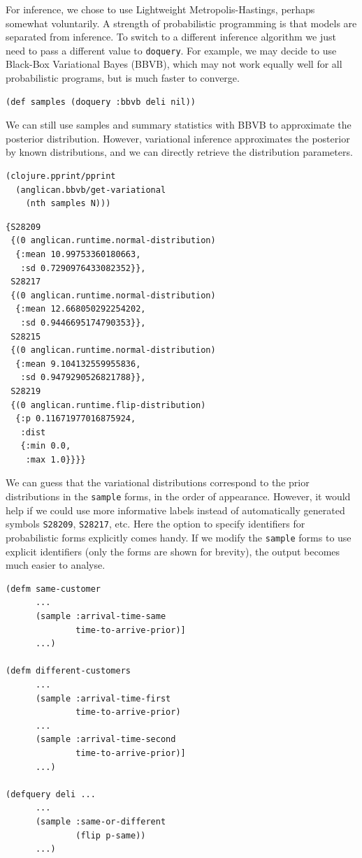 \documentclass[preprint]{sigplanconf}
\begin{document}
For inference, we chose to use  Lightweight
Metropolis-Hastings, perhaps somewhat voluntarily. A strength of
probabilistic programming is that models are separated from
inference. To switch to a different inference algorithm we just
need to pass a different value to \texttt{doquery}. For example,
we may decide to use Black-Box Variational Bayes (BBVB), which
may not work equally well for all probabilistic programs, but is
much faster to converge.

\begin{lstlisting}[style=default]
(def samples (doquery :bbvb deli nil))
\end{lstlisting}

We can still use samples and summary statistics with BBVB to
approximate the posterior distribution. However, variational
inference approximates the posterior by known distributions,
and we can directly retrieve the distribution parameters.

\begin{lstlisting}[style=default]
(clojure.pprint/pprint
  (anglican.bbvb/get-variational 
    (nth samples N)))
\end{lstlisting}

\begin{lstlisting}[style=default]
{S28209
 {(0 anglican.runtime.normal-distribution)
  {:mean 10.99753360180663,
   :sd 0.7290976433082352}},
 S28217
 {(0 anglican.runtime.normal-distribution)
  {:mean 12.668050292254202,
   :sd 0.9446695174790353}},
 S28215
 {(0 anglican.runtime.normal-distribution)
  {:mean 9.104132559955836,
   :sd 0.9479290526821788}},
 S28219
 {(0 anglican.runtime.flip-distribution)
  {:p 0.11671977016875924,
   :dist
   {:min 0.0,
    :max 1.0}}}}
\end{lstlisting}

We can guess that the variational distributions correspond to the
prior distributions in the \texttt{sample} forms, in the order
of appearance. However, it would help if we could use more
informative labels instead of automatically generated symbols
\texttt{S28209}, \texttt{S28217}, etc. Here the option to
specify identifiers for probabilistic forms explicitly comes
handy. If we modify the \texttt{sample} forms to use explicit identifiers
(only the forms are shown for brevity), the output becomes much
easier to analyse.

\begin{lstlisting}[style=default]
(defm same-customer 
      ...
      (sample :arrival-time-same
              time-to-arrive-prior)]
      ...)

(defm different-customers
      ... 
      (sample :arrival-time-first
              time-to-arrive-prior)
      ...
      (sample :arrival-time-second
              time-to-arrive-prior)]
      ...)

(defquery deli ...
      ...
      (sample :same-or-different
              (flip p-same))
      ...)
\end{lstlisting}
\end{document}
